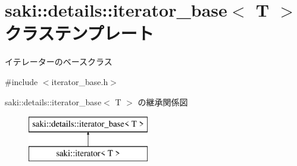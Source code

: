 \hypertarget{classsaki_1_1details_1_1iterator__base}{}\section{saki\+:\+:details\+:\+:iterator\+\_\+base$<$ T $>$ クラステンプレート}
\label{classsaki_1_1details_1_1iterator__base}


イテレーターのベースクラス  




{\ttfamily \#include $<$iterator\+\_\+base.\+h$>$}

saki\+:\+:details\+:\+:iterator\+\_\+base$<$ T $>$ の継承関係図\begin{figure}[H]
\begin{center}
\leavevmode
\includegraphics[height=2.000000cm]{classsaki_1_1details_1_1iterator__base}
\end{center}
\end{figure}
